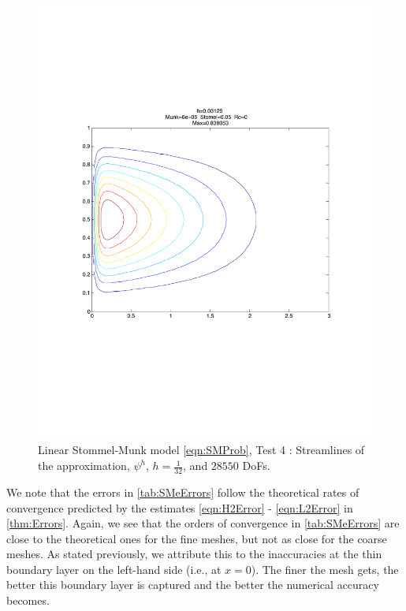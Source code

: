 \begin{figure}%
  \begin{center}
    \includegraphics[scale=0.5]{Figures/StommelMunk2.pdf}
    \caption{Linear Stommel-Munk model \eqref{eqn:SMProb}, Test 4 \cite{Cascon}: Streamlines of the approximation,
    $\psi^h$, $h=\frac{1}{32}$, and $28550$ DoFs.}
    \label{fig:SMe}
  \end{center}
\end{figure}

We note that the errors in \autoref{tab:SMeErrors} follow the theoretical rates
of convergence predicted by the estimates \eqref{eqn:H2Error} -
\eqref{eqn:L2Error} in \autoref{thm:Errors}. Again, we see that the orders of
convergence in \autoref{tab:SMeErrors} are close to the theoretical ones for the
fine meshes, but not as close for the coarse meshes. As stated previously, we
attribute this to the inaccuracies at the thin boundary layer on the left-hand
side (i.e., at $x=0$). The finer the mesh gets, the better this boundary layer
is captured and the better the numerical accuracy becomes.

